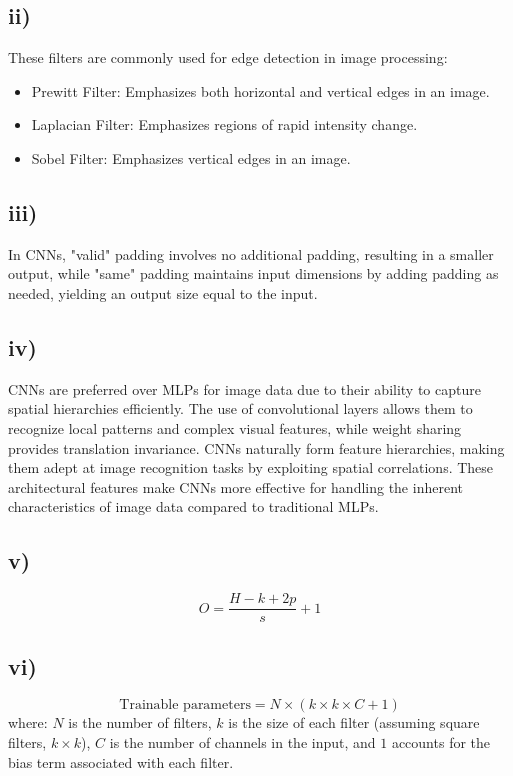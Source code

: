 \documentclass{article}
\begin{document}
\subsection*{ii)}
These filters are commonly used for edge detection in image processing: 
\begin{itemize}
    \item Prewitt Filter: Emphasizes both horizontal and vertical edges in an image.
    \item Laplacian Filter: Emphasizes regions of rapid intensity change.
    \item Sobel Filter: Emphasizes vertical edges in an image.
\end{itemize}

\subsection*{iii)}
In CNNs, "valid" padding involves no additional padding, resulting in a smaller output, while "same" padding maintains input dimensions by adding padding as needed, yielding an output size equal to the input.

\subsection*{iv)}
CNNs are preferred over MLPs for image data due to their ability to capture spatial hierarchies efficiently. The use of convolutional layers allows them to recognize local patterns and complex visual features, while weight sharing provides translation invariance. CNNs naturally form feature hierarchies, making them adept at image recognition tasks by exploiting spatial correlations. These architectural features make CNNs more effective for handling the inherent characteristics of image data compared to traditional MLPs.

\subsection*{v)}
\[ O = \frac{{H - k + 2p}}{{s}} + 1 \]

\subsection*{vi)}
\[ \text{Trainable parameters} = N \times (k \times k \times C + 1) \]
where:
\( N \) is the number of filters,
\( k \) is the size of each filter (assuming square filters, \( k \times k \)),
\( C \) is the number of channels in the input, and
\( 1 \) accounts for the bias term associated with each filter.
\end{document}
